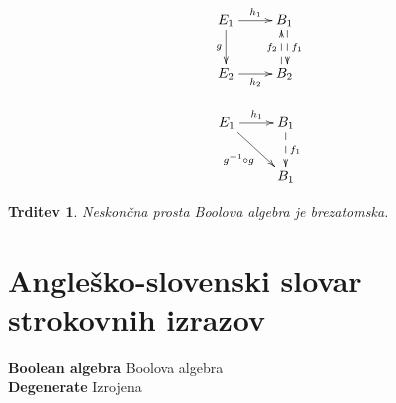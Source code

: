 \documentclass{amsart}
\newcommand{\geslo}[2]{\noindent\textbf{#1} \quad \hangindent=1cm #2\\[-1pc]}
\newtheorem{trditev}[izrek]{Trditev}
\begin{document}
\begin{table*}[!htb]
    \begin{minipage}{.5\linewidth}
      \centering
        \begin{equation*}
            \xymatrix{
            {E_1}
            \ar[r]^{h_1}
            \ar@{->}[d]_{g}
            &
            {B_1}
            \ar@<0.5ex>@{-->}[d]^{f_1}
            \\
            {E_2}
            \ar[r]_{h_2}
            &
            {B_2}   
            \ar@<0.5ex>@{-->}[u]^{f_2}
            }
        \end{equation*}
    \end{minipage}%
    \begin{minipage}{.5\linewidth}
      \centering
        \begin{equation*}
            \xymatrix{
              {E_1}
              \ar[r]^{h_1}
              \ar@{->}[dr]_{g^{-1} \circ g}
              &
              {B_1}
              \ar@{-->}[d]^{f_1}
              \\
              &
              {B_1}      
            }
        \end{equation*}
    \end{minipage} 
\end{table*}

\begin{trditev}
    Neskončna prosta Boolova algebra je brezatomska.
\end{trditev}

































\newpage
\section*{Angleško-slovenski slovar strokovnih izrazov}


\geslo{Boolean algebra}{Boolova algebra}

\geslo{Degenerate}{Izrojena}
\end{document}
